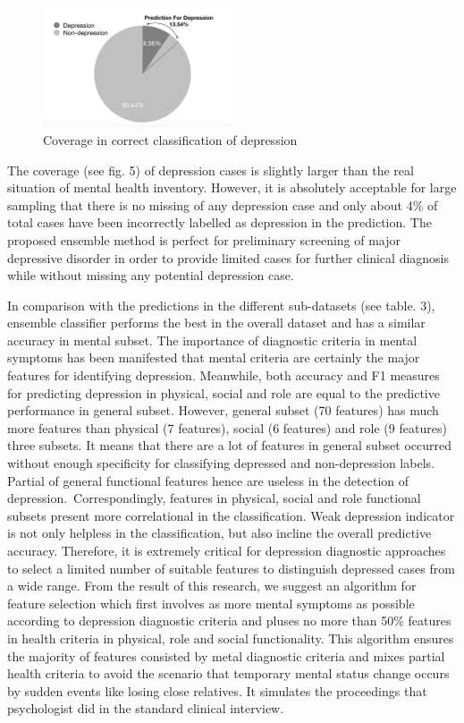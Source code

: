 \documentclass[10pt,journal,compsoc]{IEEEtran}
\begin{document}
\begin{figure}[h]
\includegraphics[width=0.5\textwidth]{coverage.png}
\caption{Coverage in correct classification of depression} \label{fig5}
\end{figure}
The coverage (see fig. 5) of depression cases is slightly larger than the real situation of mental health inventory. However, it is absolutely acceptable for large sampling that there is no missing of any depression case and only about 4\% of total cases have been incorrectly labelled as depression in the prediction. The proposed ensemble method is perfect for preliminary screening of major depressive disorder in order to provide limited cases for further clinical diagnosis while without missing any potential depression case. 

In comparison with the predictions in the different sub-datasets (see table. 3), ensemble classifier performs the best in the overall dataset and has a similar accuracy in mental subset. The importance of diagnostic criteria in mental symptoms has been manifested that mental criteria are certainly the major features for identifying depression. Meanwhile, both accuracy and F1 measures for predicting depression in physical, social and role are equal to the predictive performance in general subset. However, general subset (70 features) has much more features than physical (7 features), social (6 features) and role (9 features) three subsets. It means that there are a lot of features in general subset occurred without enough specificity for classifying depressed and non-depression labels. Partial of general functional features hence are useless in the detection of depression. Correspondingly, features in physical, social and role functional subsets present more correlational in the classification. Weak depression indicator is not only helpless in the classification, but also incline the overall predictive accuracy. Therefore, it is extremely critical for depression diagnostic approaches to select a limited number of suitable features to distinguish depressed cases from a wide range. From the result of this research, we suggest an algorithm for feature selection which first involves as more mental symptoms as possible according to depression diagnostic criteria and pluses no more than 50\% features in health criteria in physical, role and social functionality. This algorithm ensures the majority of features consisted by metal diagnostic criteria and mixes partial health criteria to avoid the scenario that temporary mental status change occurs by sudden events like losing close relatives. It simulates the proceedings that psychologist did in the standard clinical interview. 
%
%
%
%
\end{document}
